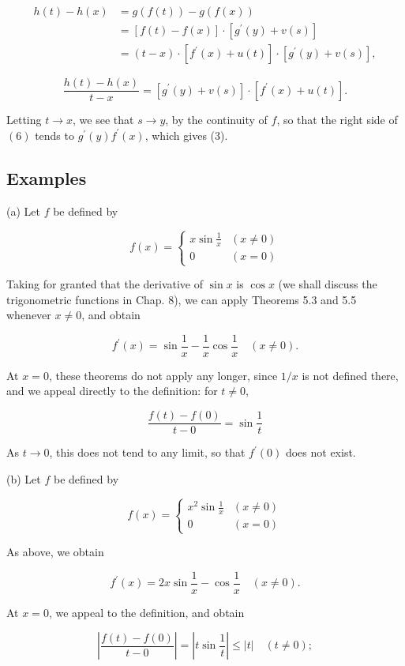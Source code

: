 \documentclass[10pt]{article}
\begin{document}
$$
\begin{aligned}
h(t)-h(x) & =g(f(t))-g(f(x)) \\
& =[f(t)-f(x)] \cdot\left[g^{\prime}(y)+v(s)\right] \\
& =(t-x) \cdot\left[f^{\prime}(x)+u(t)\right] \cdot\left[g^{\prime}(y)+v(s)\right],
\end{aligned}
$$

$$
\frac{h(t)-h(x)}{t-x}=\left[g^{\prime}(y)+v(s)\right] \cdot\left[f^{\prime}(x)+u(t)\right] .
$$

Letting $t \rightarrow x$, we see that $s \rightarrow y$, by the continuity of $f$, so that the right side of $(6)$ tends to $g^{\prime}(y) f^{\prime}(x)$, which gives (3).

\subsection{Examples}
(a) Let $f$ be defined by

$$
f(x)= \begin{cases}x \sin \frac{1}{x} & (x \neq 0) \\ 0 & (x=0)\end{cases}
$$

Taking for granted that the derivative of $\sin x$ is $\cos x$ (we shall discuss the trigonometric functions in Chap. 8), we can apply Theorems 5.3 and 5.5 whenever $x \neq 0$, and obtain

$$
f^{\prime}(x)=\sin \frac{1}{x}-\frac{1}{x} \cos \frac{1}{x} \quad(x \neq 0) .
$$

At $x=0$, these theorems do not apply any longer, since $1 / x$ is not defined there, and we appeal directly to the definition: for $t \neq 0$,

$$
\frac{f(t)-f(0)}{t-0}=\sin \frac{1}{t}
$$

As $t \rightarrow 0$, this does not tend to any limit, so that $f^{\prime}(0)$ does not exist.

(b) Let $f$ be defined by

$$
f(x)= \begin{cases}x^{2} \sin \frac{1}{x} & (x \neq 0) \\ 0 & (x=0)\end{cases}
$$

As above, we obtain

$$
f^{\prime}(x)=2 x \sin \frac{1}{x}-\cos \frac{1}{x} \quad(x \neq 0) .
$$

At $x=0$, we appeal to the definition, and obtain

$$
\left|\frac{f(t)-f(0)}{t-0}\right|=\left|t \sin \frac{1}{t}\right| \leq|t| \quad(t \neq 0) ;
$$
\end{document}
